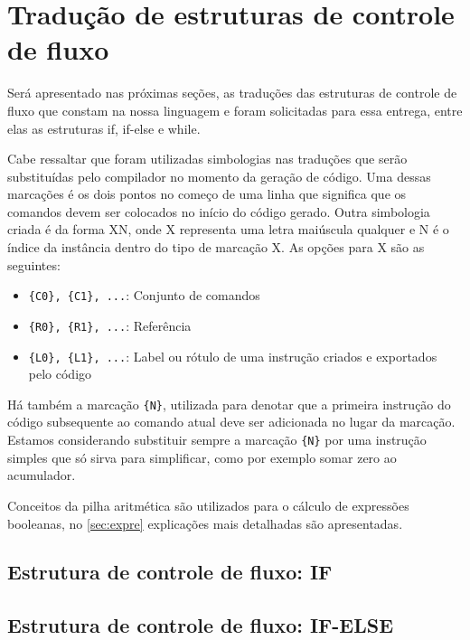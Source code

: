 
\section{Tradução de estruturas de controle de fluxo}

Será apresentado nas próximas seções, as traduções das estruturas de controle de fluxo que constam na nossa linguagem e foram solicitadas para essa entrega, entre elas as estruturas if, if-else e while.

Cabe ressaltar que foram utilizadas simbologias nas traduções que serão substituídas pelo compilador no momento da geração de código. Uma dessas marcações é os dois pontos no começo de uma linha que significa que os comandos devem ser colocados no início do código gerado. Outra simbologia criada é da forma {XN}, onde X representa uma letra maiúscula qualquer e N é o índice da instância dentro do tipo de marcação X. As opções para X são as seguintes:

\begin{itemize}
	\item \verb={C0}, {C1}, ...=: Conjunto de comandos
	\item \verb={R0}, {R1}, ...=: Referência
	\item \verb={L0}, {L1}, ...=: Label ou rótulo de uma instrução criados
            e exportados pelo código 
\end{itemize}

Há também a marcação \verb={N}=, utilizada para denotar que a primeira instrução do código subsequente ao comando atual deve ser adicionada no lugar da marcação. Estamos considerando substituir sempre a marcação \verb={N}= por uma instrução simples que só sirva para simplificar, como por exemplo somar zero ao acumulador.

Conceitos da pilha aritmética são utilizados para o cálculo de expressões
booleanas, no \autoref{sec:expre} explicações mais detalhadas são apresentadas. 

\subsection{Estrutura de controle de fluxo: IF}
\label{sec:if}



\subsection{Estrutura de controle de fluxo: IF-ELSE}
\label{sec:if-else}

